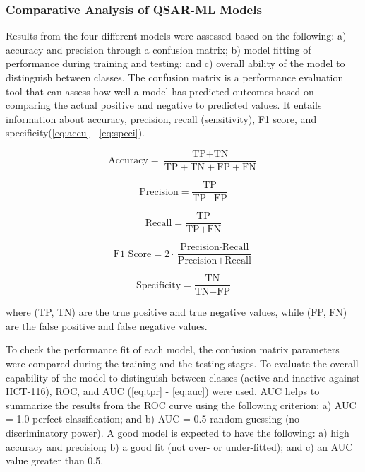 
\subsubsection*{Comparative Analysis of QSAR-ML Models}
Results from the four different models were assessed based on the following: a) accuracy and precision through a confusion matrix; b) model fitting of performance during training and testing; and c) overall ability of the model to distinguish between classes. The confusion matrix is a performance evaluation tool that can assess how well a model has predicted outcomes based on comparing the actual positive and negative to predicted values. It entails information about accuracy, precision, recall (sensitivity), F1 score, and specificity(\autoref{eq:accu} - \ref{eq:speci}). 

\begin{equation}
    \text{Accuracy} = \frac{\text{TP} + \text{TN}}{\text{TP} + \text{TN} + \text{FP} + \text{FN}}
    \label{eq:accu}
\end{equation}

\begin{equation}
    \text{Precision} = \frac{\text{TP}}{\text{TP} + \text{FP}}
    \label{eq:prec}
\end{equation}

\begin{equation}
   \text{Recall} = \frac{\text{TP}}{\text{TP} + \text{FN}}
   \label{eq:recall}
\end{equation}

\begin{equation}
     \text{F1 Score} = 2 \cdot \frac{\text{Precision} \cdot \text{Recall}}{\text{Precision} + \text{Recall}}
     \label{eq:f1}
\end{equation}

\begin{equation}
    \text{Specificity} = \frac{\text{TN}}{\text{TN} + \text{FP}}
    \label{eq:speci}
\end{equation}

where (TP, TN) are the true positive and true negative values, while (FP, FN) are the false positive and false negative values.

To check the performance fit of each model, the confusion matrix parameters were compared during the training and the testing stages. To evaluate the overall capability of the model to distinguish between classes (active and inactive against HCT-116), ROC, and AUC (\autoref{eq:tpr} - \ref{eq:auc}) were used. AUC helps to summarize the results from the ROC curve using the following criterion: a) AUC = 1.0 perfect classification; and b) AUC = 0.5 random guessing (no discriminatory power). A good model is expected to have the following: a) high accuracy and precision; b) a good fit (not over- or under-fitted); and c) an AUC value greater than 0.5. 

